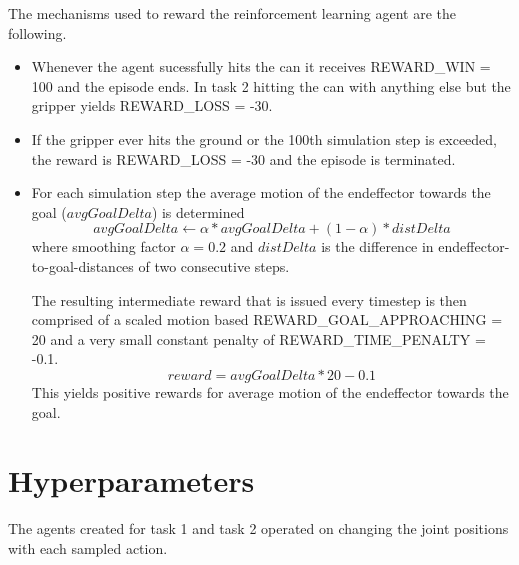 \documentclass[10pt,journal,compsoc]{IEEEtran}
\begin{document}
The mechanisms used to reward the reinforcement learning agent are the following.
\begin{itemize}

    \item Whenever the agent sucessfully hits the can it receives REWARD\_WIN = 100 and the episode ends. In task 2 hitting the can with anything else but the gripper yields REWARD\_LOSS = -30.

    \item If the gripper ever hits the ground or the 100th simulation step is exceeded, the reward is REWARD\_LOSS = -30 and the episode is terminated.

    \item For each simulation step the average motion of the endeffector towards the goal ($avgGoalDelta$) is determined
    $$ avgGoalDelta \leftarrow \alpha * avgGoalDelta + (1 - \alpha) * distDelta $$
    where smoothing factor $\alpha = 0.2$ and $distDelta$ is the difference in endeffector-to-goal-distances of two consecutive steps.

    The resulting intermediate reward  that is issued every timestep is then comprised of a scaled motion based REWARD\_GOAL\_APPROACHING = 20 and a very small constant penalty of REWARD\_TIME\_PENALTY = -0.1.
    $$ reward = avgGoalDelta * 20 - 0.1 $$
    This yields positive rewards for average motion of the endeffector towards the goal.

\end{itemize}

\section{Hyperparameters}  
The agents created for task 1 and task 2 operated on changing the joint positions with each sampled action. 
\end{document}
